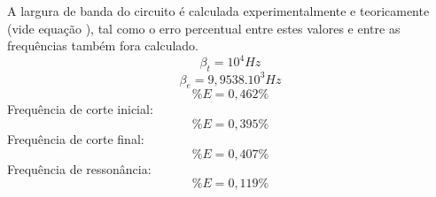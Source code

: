 A largura de banda do circuito é calculada experimentalmente e teoricamente (vide equação ), tal como o erro percentual entre estes valores e entre as frequências também fora calculado.
\begin{equation}
	\beta_{t} = 10^4 Hz
\end{equation}
\begin{equation}
	\beta_{e} = 9,9538.10^3 Hz
\end{equation}
\begin{equation}
	\%E = 0,462\%
\end{equation}
Frequência de corte inicial:
\begin{equation}
	\%E = 0,395\%
\end{equation}
Frequência de corte final:
\begin{equation}
	\%E = 0,407\%
\end{equation}
Frequência de ressonância:
\begin{equation}
	\%E = 0,119\%
\end{equation}

\pagebreak